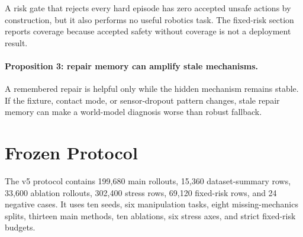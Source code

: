 \documentclass{article}
\begin{document}
A risk gate that rejects every hard episode has zero accepted unsafe actions by construction, but it also performs no useful robotics task. The fixed-risk section reports coverage because accepted safety without coverage is not a deployment result.

\paragraph{Proposition 3: repair memory can amplify stale mechanisms.}

A remembered repair is helpful only while the hidden mechanism remains stable. If the fixture, contact mode, or sensor-dropout pattern changes, stale repair memory can make a world-model diagnosis worse than robust fallback.

\section{Frozen Protocol}

The v5 protocol contains 199,680 main rollouts, 15,360 dataset-summary rows, 33,600 ablation rollouts, 302,400 stress rows, 69,120 fixed-risk rows, and 24 negative cases. It uses ten seeds, six manipulation tasks, eight missing-mechanics splits, thirteen main methods, ten ablations, six stress axes, and strict fixed-risk budgets.
\end{document}
